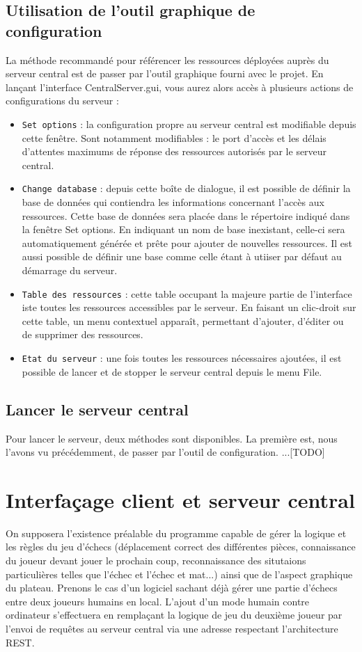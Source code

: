 \documentclass[a4paper,11pt]{article}
\begin{document}
\subsection{Utilisation de l'outil graphique de configuration}
		La méthode recommandé pour référencer les ressources déployées auprès du serveur central est de passer par l'outil graphique fourni avec le projet. En lançant l'interface CentralServer.gui, vous aurez alors accès à plusieurs actions de configurations du serveur :
\begin{itemize}
	\item {\tt Set options} : la configuration propre au serveur central est modifiable depuis cette fenêtre. Sont notamment modifiables : le port d'accès et les délais d'attentes maximums de réponse des ressources autorisés par le serveur central.
	\item {\tt Change database} : depuis cette boîte de dialogue, il est possible de définir la base de données qui contiendra les informations concernant l'accès aux ressources. Cette base de données sera placée dans le répertoire indiqué dans la fenêtre Set options. En indiquant un nom de base inexistant, celle-ci sera automatiquement générée et prête pour ajouter de nouvelles ressources. Il est aussi possible de définir une base comme celle étant à utiiser par défaut au démarrage du serveur.
   \item {\tt Table des ressources} : cette table occupant la majeure partie de l'interface iste toutes les ressources accessibles par le serveur. En faisant un clic-droit sur cette table, un menu contextuel apparaît, permettant d'ajouter, d'éditer ou de supprimer des ressources.
   \item {\tt Etat du serveur} : une fois toutes les ressources nécessaires ajoutées, il est possible de lancer et de stopper le serveur central depuis le menu File.
\end{itemize}
\subsection{Lancer le serveur central}
		Pour lancer le serveur, deux méthodes sont disponibles. La première est, nous l'avons vu précédemment, de passer par l'outil de configuration.
		...[TODO]

\section{Interfaçage client et serveur central}
        On supposera l'existence préalable du programme capable de gérer la logique et les règles du jeu d'échecs (déplacement correct des différentes pièces, connaissance du joueur devant jouer le prochain coup, reconnaissance des situtaions particulières telles que l'échec et l'échec et mat...) ainsi que de l'aspect graphique du plateau. Prenons le cas d'un logiciel sachant déjà gérer une partie d'échecs entre deux joueurs humains en local. L'ajout d'un mode humain contre ordinateur s'effectuera en remplaçant la logique de jeu du deuxième joueur par l'envoi de requêtes au serveur central via une adresse respectant l'architecture REST. 
\end{document}
